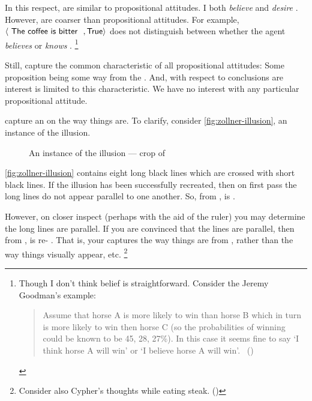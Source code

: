 \begin{note}
  In this respect, \evalN{} are similar to propositional attitudes.
  I both \emph{believe}  and \emph{desire} .
  However,  are coarser than propositional attitudes.
  For example, \(\pv{\prop{The coffee is bitter}}{\val{True}}\) does not distinguish between whether the agent \emph{believes} or \emph{knows} .%
  \footnote{
    \label{fn:belief-is-difficult}
    Though I don't think belief is straightforward.
    Consider the Jeremy Goodman's example:
    \begin{quote}
      Assume that horse A is more likely to win than horse B which in turn is more likely to win then horse C (so the probabilities of winning could be known to be 45, 28, 27\%).
      In this case it seems fine to say `I think horse A will win' or `I believe horse A will win'.%
      \mbox{ }\hfill\mbox{(\cite[1440]{Hawthorne:2016wv})}
    \end{quote}
  }

  Still,  capture the common characteristic of all propositional attitudes:
  Some proposition being some way from the \agpe{}.
  And, with respect to conclusions are interest is limited to this characteristic.
  We have no interest with any particular propositional attitude.
\end{note}

\begin{note}
  \nocite{Scriven:1962vq}
  \nocite{Woodward:2021ue}
  \nocite{Perry:1979vc}
  \nocite{Perry:1986aa}
  \nocite{Collins:1997wn}

   capture an \agpe{} on the way things are.
  To clarify, consider \autoref{fig:zollner-illusion}, an instance of the \citeauthor{Zollner:1860vx} illusion.

  \begin{figure}[!h]
    \centering
    \def\svgwidth{\columnwidth}
    
    \caption{An instance of the \citeauthor{Zollner:1860vx} illusion --- crop of ~\textcite{Fibonacci:2007vj}}
    \label{fig:zollner-illusion}
  \end{figure}

  \autoref{fig:zollner-illusion} contains eight long black lines which are crossed with short black lines.
  If the illusion has been successfully recreated, then on first pass the long lines do not appear parallel to one another.
  So, from ,  is \evaled{} .

  However, on closer inspect (perhaps with the aid of the ruler) you may determine the long lines are parallel.
  If you are convinced that the lines are parallel, then from ,  is re-\evaled{} .
  That is, your \evalN{} captures the way things are from , rather than the way things visually appear, etc.%
  \footnote{
    Consider also Cypher's thoughts while eating steak. (\cite[330--331]{Wachowski:2000uh})
  }
\end{note}

